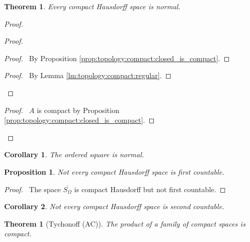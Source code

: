 \documentclass{report}
\let\qed\relax
\newtheorem{prop}[lm]{Proposition}
\newtheorem{thm}[lm]{Theorem}
\newtheorem{cor}{Corollary}[lm]
\theoremstyle{definition}
\begin{document}
    \begin{thm}
   Every compact Hausdorff space is normal.
  \end{thm}

  \begin{proof}
   \pf
   \begin{proof}
     \begin{proof}
       \pf\ By Proposition \ref{prop:topology:compact:closed_is_compact}.
     \end{proof}
     \qedstep
     \begin{proof}
       \pf\ By Lemma \ref{lm:topology:compact:regular}.
     \end{proof}
   \end{proof}
   \begin{proof}
     \pf\ $A$ is compact by Proposition
     \ref{prop:topology:compact:closed_is_compact}.
   \end{proof}
   \qed
  \end{proof}

  \begin{cor}
   The ordered square is normal.
  \end{cor}

  \begin{prop}
    Not every compact Hausdorff space is first countable.
  \end{prop}

  \begin{proof}
    \pf\ The space $\overline{S_\Omega}$ is compact Hausdorff but not first countable. \qed
  \end{proof}

\begin{cor}
  Not every compact Hausdorff space is second countable.
\end{cor}

\begin{thm}[Tychonoff (AC)]
  The product of a family of compact spaces is compact.
\end{thm}
\end{document}
